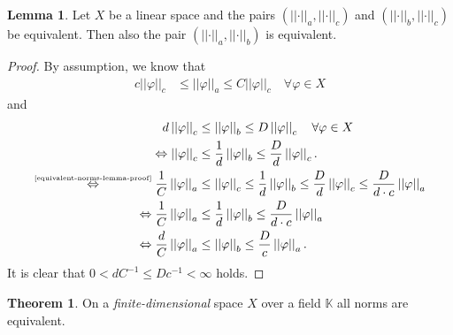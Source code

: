 \documentclass[12pt, a4paper]{article}
\numberwithin{equation}{section}
\theoremstyle{definition}
\theoremstyle{definition}
\newtheorem{lemma}[thm]{Lemma} %
\newtheorem{theorem}[thm]{Theorem}
\newcommand{\norm}[2]{\left\vert\left\vert #1 \right\vert\right\vert_{#2}}
\begin{document}
	\begin{lemma}
		Let $X$ be a linear space and the pairs $\left(\norm{\cdot}{a}, \norm{\cdot}{c}\right)$ and $\left(\norm{\cdot}{b}, \norm{\cdot}{c}\right)$ be equivalent. Then also the pair $\left(\norm{\cdot}{a}, \norm{\cdot}{b}\right)$ is equivalent. 
	\end{lemma}

	\begin{proof}
		By assumption, we know that 
		\begin{align}
			c\norm{\varphi}{c} &\leq \norm{\varphi}{a} \leq C\norm{\varphi}{c} \quad \forall \varphi\in X \label{equivalent-norms-lemma-proof}
		\end{align}
		and 
		\begin{align}
			d\norm{\varphi}{c} &\leq \norm{\varphi}{b} \leq D\norm{\varphi}{c} \quad \forall \varphi\in X
								\\ 
			\Leftrightarrow \norm{\varphi}{c} &\leq \frac{1}{d}\norm{\varphi}{b} \leq \frac{D}{d}\norm{\varphi}{c}. 
								\\
			\overset{\tiny\eqref{equivalent-norms-lemma-proof}}{\Leftrightarrow} \frac{1}{C}\norm{\varphi}{a} &\leq \norm{\varphi}{c} \leq \frac{1}{d}\norm{\varphi}{b} \leq \frac{D}{d}\norm{\varphi}{c} \leq \frac{D}{d\cdot c}\norm{\varphi}{a}  
								\\ 
			\Leftrightarrow \frac{1}{C}\norm{\varphi}{a} &\leq \frac{1}{d}\norm{\varphi}{b} \leq \frac{D}{d\cdot c}\norm{\varphi}{a}
								\\ 
			\Leftrightarrow \frac{d}{C}\norm{\varphi}{a} &\leq \norm{\varphi}{b} \leq \frac{D}{c}\norm{\varphi}{a}. 
		\end{align}
		It is clear that $0 < dC^{-1} \leq Dc^{-1} < \infty$ holds. 
	\end{proof} 

	\begin{theorem}\label{finite_dimensional_norm_equivalence}
		On a \textit{finite-dimensional} space $X$ over a field $\mathbb{K}$ all norms are equivalent. 
	\end{theorem}
\end{document}
